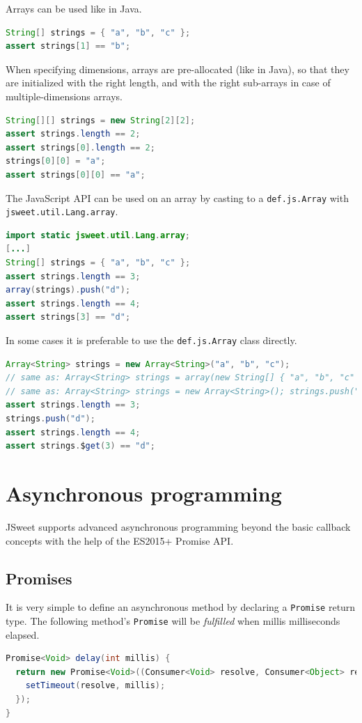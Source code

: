 \documentclass[a4paper]{report}
\begin{document}
Arrays can be used like in Java. 

\begin{lstlisting}[language=Java]
String[] strings = { "a", "b", "c" };
assert strings[1] == "b";
\end{lstlisting}

When specifying dimensions, arrays are pre-allocated (like in Java), so that they are initialized with the right length, and with the right sub-arrays in case of multiple-dimensions arrays.

\begin{lstlisting}[language=Java]
String[][] strings = new String[2][2];
assert strings.length == 2;
assert strings[0].length == 2;
strings[0][0] = "a";
assert strings[0][0] == "a";
\end{lstlisting}

The JavaScript API can be used on an array by casting to a \texttt{def.\-js.\-Array} with \texttt{jsweet.\-util.\-Lang.\-array}.

\begin{lstlisting}[language=Java]
import static jsweet.util.Lang.array;
[...]
String[] strings = { "a", "b", "c" };
assert strings.length == 3;
array(strings).push("d");
assert strings.length == 4;
assert strings[3] == "d";
\end{lstlisting}

In some cases it is preferable to use the \texttt{def.\-js.\-Array} class directly.

\begin{lstlisting}[language=Java]
Array<String> strings = new Array<String>("a", "b", "c");
// same as: Array<String> strings = array(new String[] { "a", "b", "c" });
// same as: Array<String> strings = new Array<String>(); strings.push("a", "b", "c");
assert strings.length == 3;
strings.push("d");
assert strings.length == 4;
assert strings.$get(3) == "d";
\end{lstlisting}

\section{Asynchronous programming}
JSweet supports advanced asynchronous programming beyond the basic callback concepts with the help of the ES2015+ Promise API.

\subsection{Promises}
It is very simple to define an asynchronous method by declaring a \texttt{Promise} return type. The following method's \texttt{Promise} will be \emph{fulfilled} when millis milliseconds elapsed.
\begin{lstlisting}[language=Java]
Promise<Void> delay(int millis) {
  return new Promise<Void>((Consumer<Void> resolve, Consumer<Object> reject) -> {
    setTimeout(resolve, millis);
  });
}
\end{lstlisting}
\end{document}
